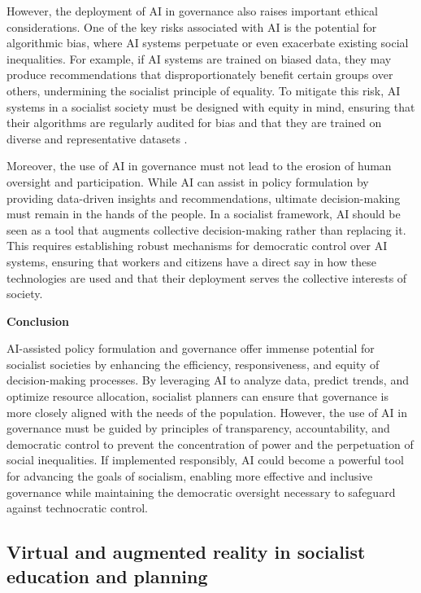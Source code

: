 \begin{refsection}
However, the deployment of AI in governance also raises important ethical considerations. One of the key risks associated with AI is the potential for algorithmic bias, where AI systems perpetuate or even exacerbate existing social inequalities. For example, if AI systems are trained on biased data, they may produce recommendations that disproportionately benefit certain groups over others, undermining the socialist principle of equality. To mitigate this risk, AI systems in a socialist society must be designed with equity in mind, ensuring that their algorithms are regularly audited for bias and that they are trained on diverse and representative datasets \cite[pp.~75-80]{o_neil_ai_bias}. 

Moreover, the use of AI in governance must not lead to the erosion of human oversight and participation. While AI can assist in policy formulation by providing data-driven insights and recommendations, ultimate decision-making must remain in the hands of the people. In a socialist framework, AI should be seen as a tool that augments collective decision-making rather than replacing it. This requires establishing robust mechanisms for democratic control over AI systems, ensuring that workers and citizens have a direct say in how these technologies are used and that their deployment serves the collective interests of society.

\textbf{Conclusion}

AI-assisted policy formulation and governance offer immense potential for socialist societies by enhancing the efficiency, responsiveness, and equity of decision-making processes. By leveraging AI to analyze data, predict trends, and optimize resource allocation, socialist planners can ensure that governance is more closely aligned with the needs of the population. However, the use of AI in governance must be guided by principles of transparency, accountability, and democratic control to prevent the concentration of power and the perpetuation of social inequalities. If implemented responsibly, AI could become a powerful tool for advancing the goals of socialism, enabling more effective and inclusive governance while maintaining the democratic oversight necessary to safeguard against technocratic control.

\subsection{Virtual and augmented reality in socialist education and planning}


\end{refsection}
